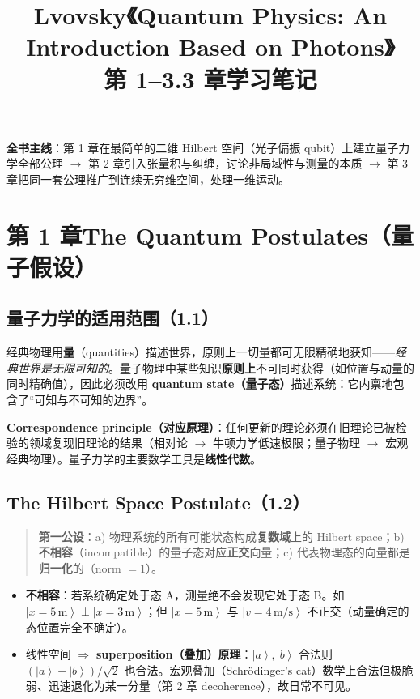 \documentclass[11pt]{ctexart}
\title{\textbf{Lvovsky《Quantum Physics: An Introduction Based on Photons》\\第 1--3.3 章学习笔记}}
\author{}
\date{}
\newcommand{\ket}[1]{\left|#1\right\rangle}
\begin{document}
\maketitle

\noindent\textbf{全书主线}：第 1 章在最简单的二维 Hilbert 空间（光子偏振 qubit）上建立量子力学全部公理 $\to$ 第 2 章引入张量积与纠缠，讨论非局域性与测量的本质 $\to$ 第 3 章把同一套公理推广到连续无穷维空间，处理一维运动。

\tableofcontents

\section{第 1 章\quad The Quantum Postulates（量子假设）}

\subsection{量子力学的适用范围（1.1）}

经典物理用\textbf{量}（quantities）描述世界，原则上一切量都可无限精确地获知——\emph{经典世界是无限可知的}。量子物理中某些知识\textbf{原则上}不可同时获得（如位置与动量的同时精确值），因此必须改用 \textbf{quantum state（量子态）}描述系统：它内禀地包含了``可知与不可知的边界''。

\textbf{Correspondence principle（对应原理）}：任何更新的理论必须在旧理论已被检验的领域复现旧理论的结果（相对论 $\to$ 牛顿力学低速极限；量子物理 $\to$ 宏观经典物理）。量子力学的主要数学工具是\textbf{线性代数}。

\subsection{The Hilbert Space Postulate（1.2）}

\begin{quote}
\textbf{第一公设}：a) 物理系统的所有可能状态构成\textbf{复数域}上的 Hilbert space；b) \textbf{不相容}（incompatible）的量子态对应\textbf{正交}向量；c) 代表物理态的向量都是\textbf{归一化}的（norm $=1$）。
\end{quote}

\begin{itemize}
\item \textbf{不相容}：若系统确定处于态 A，测量绝不会发现它处于态 B。如 $\ket{x=5\,\mathrm m}\perp\ket{x=3\,\mathrm m}$；但 $\ket{x=5\,\mathrm m}$ 与 $\ket{v=4\,\mathrm{m/s}}$ 不正交（动量确定的态位置完全不确定）。
\item 线性空间 $\Rightarrow$ \textbf{superposition（叠加）原理}：$\ket a,\ket b$ 合法则 $(\ket a+\ket b)/\sqrt2$ 也合法。宏观叠加（Schrödinger's cat）数学上合法但极脆弱、迅速退化为某一分量（第 2 章 decoherence），故日常不可见。
\end{itemize}
\end{document}
